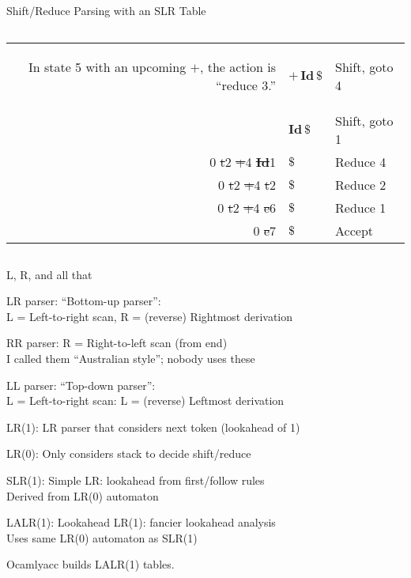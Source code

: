 \documentclass{plt}
\newcommand{\id}{\textbf{Id}}
\begin{document}
\begin{frame}[t]{Shift/Reduce Parsing with an SLR Table}
\begin{columns}
\begin{column}{0.55\textwidth}
\begin{tabular}{r|ll}
\begin{onlyenv}
\begin{reason}
          In state 5 with an upcoming $+$, the action is ``reduce 3.''
        \end{reason}
      \end{onlyenv}
\onslide<6->{%
      \st{ }0 \st{t}2 & $ +\, \id \,\$$ & Shift, goto 4 \\}
      \begin{onlyenv}<6>
        \begin{reason}
          This time, we strip off the RHS for rule 3, the handle $\id * t$,
          exposing state 0, so we push a $t$ with state 2.
        \end{reason}
      \end{onlyenv}
\onslide<7->{
      \st{ }0 \st{t}2 \st{+}4 & $ \id \,\$$ & Shift, goto 1 \\
      \st{ }0 \st{t}2 \st{+}4 \st{\id}1 & $\$$ & Reduce 4 \\
      \st{ }0 \st{t}2 \st{+}4 \st{t}2 & $\$$ & Reduce 2 \\
      \st{ }0 \st{t}2 \st{+}4 \st{e}6 & $\$$ & Reduce 1 \\
      \st{ }0 \st{e}7 & $\$$ & Accept} \\
      \bottomrule
    \end{tabular}
  \end{column}
\end{columns}

\end{frame}

\begin{frame}{L, R, and all that}

LR parser: ``Bottom-up parser'': \\
L = Left-to-right scan, R = (reverse) Rightmost derivation

RR parser: R = Right-to-left scan (from end) \\
I called them ``Australian style''; nobody uses these

LL parser: ``Top-down parser'': \\
L = Left-to-right scan: L = (reverse) Leftmost derivation

LR(1): LR parser that considers next token (lookahead of 1)

LR(0): Only considers stack to decide shift/reduce

SLR(1): Simple LR: lookahead from first/follow rules \\
Derived from LR(0) automaton

LALR(1): Lookahead LR(1): fancier lookahead analysis \\
Uses same LR(0) automaton as SLR(1)

Ocamlyacc builds LALR(1) tables.

\end{frame}
\end{document}
